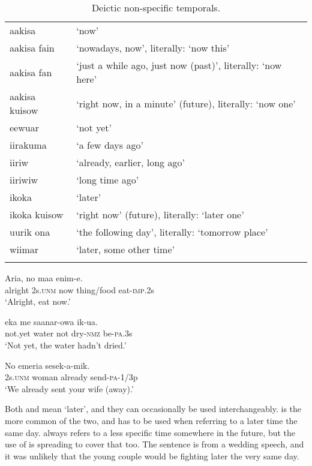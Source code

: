 \begin{table}
\begin{tabular}{ll}
\mytoprule
aakisa &`now'\\
aakisa fain &`nowadays, now', literally: `now this'\\
aakisa fan &`just a while ago, just now (past)', literally: `now here'\\
aakisa kuisow &`right now, in a minute' (future), literally: `now one'\\
eewuar &`not yet'\\
iirakuma &`a few days ago'\\
iiriw &`already, earlier, long ago'\\
iiriwiw &`long time ago'\\
ikoka &`later'\\
ikoka kuisow &`right now' (future), literally: `later one'\\
uurik ona &`the following day', literally: `tomorrow place'\\
wiimar &`later, some other time'\\
\mybottomrule 
\end{tabular}
\caption{Deictic non-specific temporals.}
\label{tab:3:deicticnonspecifictemporals}
\end{table}

\ea%
\label{ex:3:x473}
\gll Aria, no  maa enim-e. \\
alright 2s.\textsc{unm} now thing/food eat-\textsc{imp}.2s\\
\glt`Alright, eat now.'
\z

\ea%
\label{ex:3:x1215}
\gll {}  eka me saanar-owa ik-ua. \\
not.yet water not dry-\textsc{nmz} be-\textsc{pa}.3s\\
\glt`Not yet, the water hadn't dried.'
\z

\ea%
\label{ex:3:x474}
\gll No emeria  sesek-a-mik. \\
2s.\textsc{unm} woman already send-\textsc{pa}-1/3p\\
\glt`We already sent your wife (away).'
\z

Both  and  mean `later', and they can occasionally be used interchangeably.  is the more common of the two, and has to be used when referring to a later time the same day.  always refers to a less specific time somewhere in the future, but the use of  is spreading to cover that too. The sentence  is from a wedding speech, and it was unlikely that the young couple would be fighting later the very same day.

